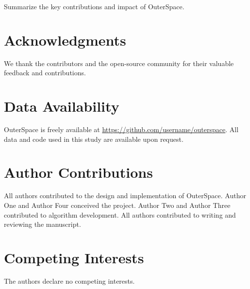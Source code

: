 \documentclass[9pt,twocolumn,twoside]{extarticle}
\begin{document}
Summarize the key contributions and impact of OuterSpace.

\section*{Acknowledgments}

We thank the contributors and the open-source community for their valuable feedback and contributions.

\section*{Data Availability}

OuterSpace is freely available at \url{https://github.com/username/outerspace}.
All data and code used in this study are available upon request.

\section*{Author Contributions}

All authors contributed to the design and implementation of OuterSpace. Author One and Author Four conceived the project. Author Two and Author Three contributed to algorithm development. All authors contributed to writing and reviewing the manuscript.

\section*{Competing Interests}

The authors declare no competing interests.



\end{document}
